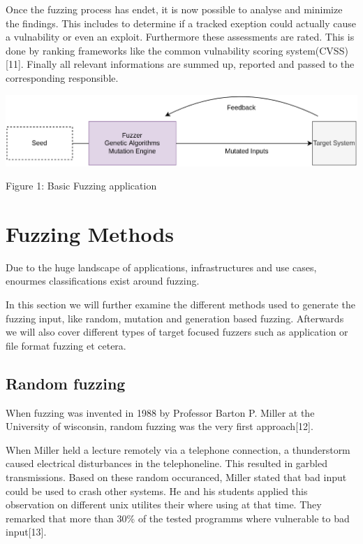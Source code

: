 \documentclass[journal=tosc,final]{iacrtrans}
\begin{document}
Once the fuzzing process has endet, it is now possible to analyse and minimize the findings. This includes to determine if a tracked exeption could actually cause a vulnability or even an exploit. Furthermore these assessments are rated. This is done by ranking frameworks like the common vulnability scoring system(CVSS)[11]. Finally all relevant informations are summed up, reported and passed to the corresponding responsible. 
\begin{shaded}

\begin{center}
\includegraphics[scale=0.2]{../final2.png}

\vspace{2mm} Figure 1: Basic Fuzzing application
\end{center}
\end{shaded}


\section{Fuzzing Methods}
Due to the huge landscape of applications, infrastructures and use cases, enourmes classifications exist around fuzzing. 

In this section we will further examine the different methods used to generate the fuzzing input, like random, mutation and generation based fuzzing. Afterwards we will also cover different types of target focused fuzzers such as application or file format fuzzing et cetera. 
\subsection{Random fuzzing}
When fuzzing was invented in 1988 by Professor Barton P. Miller at the University of wisconsin, random fuzzing was the very first approach[12].

When Miller held a lecture remotely via a telephone connection, a thunderstorm caused electrical disturbances in the telephoneline. This resulted in garbled transmissions. Based on these random occuranced, Miller stated that bad input  could be used to crash other systems. He and his students applied this observation on different unix utilites their where using at that time. They remarked that  more than 30\% of the tested programms where vulnerable to bad input[13]. 
\end{document}
